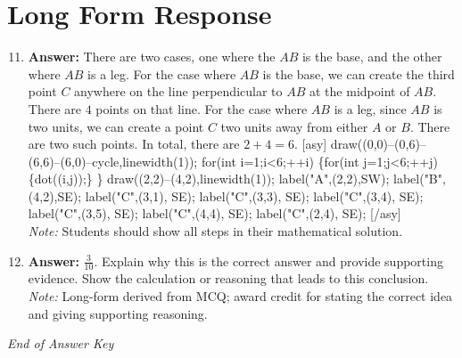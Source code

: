 \documentclass[12pt]{article}
\begin{document}
\section*{Long Form Response}
\begin{enumerate}[label=\arabic*.]
\setcounter{enumi}{10}
\item \textbf{Answer:} There are two cases, one where the $AB$ is the base, and the other where $AB$ is a leg. For the case where $AB$ is the base, we can create the third point $C$ anywhere on the line perpendicular to $AB$ at the midpoint of $AB$. There are $4$ points on that line. For the case where $AB$ is a leg, since $AB$ is two units, we can create a point $C$ two units away from either $A$ or $B$. There are two such points. In total, there are $2+4=\boxed{6}$. [asy] draw((0,0)--(0,6)--(6,6)--(6,0)--cycle,linewidth(1)); for(int i=1;i\textless{}6;++i) \{for(int j=1;j\textless{}6;++j) \{dot((i,j));\} \} draw((2,2)--(4,2),linewidth(1)); label("A",(2,2),SW); label("B",(4,2),SE); label("C",(3,1), SE); label("C",(3,3), SE); label("C",(3,4), SE); label("C",(3,5), SE); label("C",(4,4), SE); label("C",(2,4), SE); [/asy]
\\ \textit{Note:} Students should show all steps in their mathematical solution.
\item \textbf{Answer:} \ensuremath{\frac{3}{10}}. Explain why this is the correct answer and provide supporting evidence. Show the calculation or reasoning that leads to this conclusion.
\\ \textit{Note:} Long-form derived from MCQ; award credit for stating the correct idea and giving supporting reasoning.
\end{enumerate}

\vfill
\noindent\textit{End of Answer Key}
\end{document}
